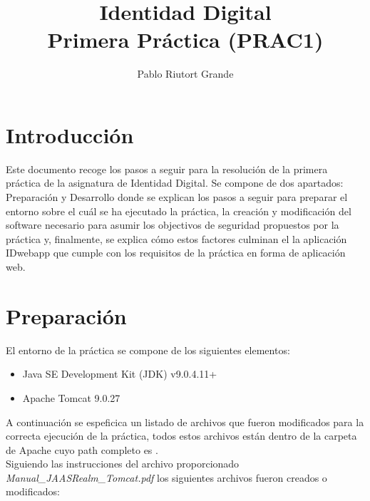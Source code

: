 \documentclass[10pt,a4paper]{article}
\author{Pablo Riutort Grande}
\title{Identidad Digital\\ \vspace{1cm}\textbf{Primera Práctica (PRAC1)}}
\begin{document}
\maketitle
\pagebreak
\section*{Introducción}
Este documento recoge los pasos a seguir para la resolución de la primera práctica de la asignatura de Identidad Digital. Se compone de dos apartados: Preparación y Desarrollo donde se explican los pasos a seguir para preparar el entorno sobre el cuál se ha ejecutado la práctica, la creación y modificación del software necesario para asumir los objectivos de seguridad propuestos por la práctica y, finalmente, se explica cómo estos factores culminan el la aplicación IDwebapp que cumple con los requisitos de la práctica en forma de aplicación web.

\section*{Preparación}
El entorno de la práctica se compone de los siguientes elementos:
\begin{itemize}
\item Java SE Development Kit (JDK) v9.0.4.11+
\item Apache Tomcat 9.0.27
\end{itemize}

A continuación se espeficica un listado de archivos que fueron modificados para la correcta ejecución de la práctica, todos estos archivos están dentro de la carpeta de Apache cuyo path completo es .\\

Siguiendo las instrucciones del archivo proporcionado \textit{Manual\_JAASRealm\_Tomcat.pdf} los siguientes archivos fueron creados o modificados:
\end{document}
